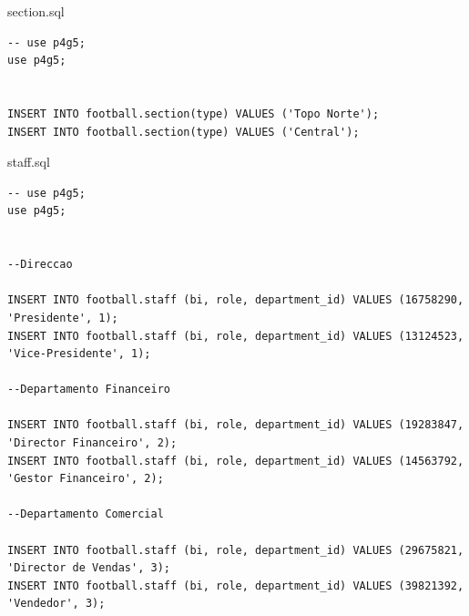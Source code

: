 \documentclass[pdftex,12pt,a4paper]{report}
\begin{document}
section.sql
\begin{lstlisting} 
-- use p4g5;
use p4g5;


INSERT INTO football.section(type) VALUES ('Topo Norte');
INSERT INTO football.section(type) VALUES ('Central');
\end{lstlisting}

staff.sql
\begin{lstlisting} 
-- use p4g5;
use p4g5;


--Direccao

INSERT INTO football.staff (bi, role, department_id) VALUES (16758290, 'Presidente', 1);
INSERT INTO football.staff (bi, role, department_id) VALUES (13124523, 'Vice-Presidente', 1);

--Departamento Financeiro

INSERT INTO football.staff (bi, role, department_id) VALUES (19283847, 'Director Financeiro', 2);
INSERT INTO football.staff (bi, role, department_id) VALUES (14563792, 'Gestor Financeiro', 2);

--Departamento Comercial

INSERT INTO football.staff (bi, role, department_id) VALUES (29675821, 'Director de Vendas', 3);
INSERT INTO football.staff (bi, role, department_id) VALUES (39821392, 'Vendedor', 3);


\end{lstlisting}
\end{document}
